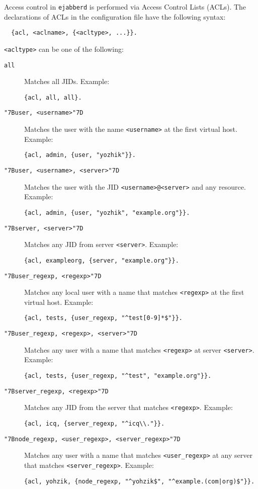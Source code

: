 \documentclass[a4paper,10pt]{article}
\newcommand{\bracehack}{\def\{{\char"7B}\def\}{\char"7D}}
\newcommand{\titem}[1]{\item[\bracehack\texttt{#1}]}
\newcommand{\term}[1]{\texttt{#1}}
\newcommand{\ejabberd}{\texttt{ejabberd}}
\begin{document}
Access control in \ejabberd{} is performed via Access Control Lists (ACLs). The
declarations of ACLs in the configuration file have the following syntax:
\begin{verbatim}
  {acl, <aclname>, {<acltype>, ...}}.
\end{verbatim}
\term{<acltype>} can be one of the following:
\begin{description}
\titem{all} Matches all JIDs. Example:
\begin{verbatim}
{acl, all, all}.
\end{verbatim}
\titem{\{user, <username>\}} Matches the user with the name
  \term{<username>} at the first virtual host. Example:
\begin{verbatim}
{acl, admin, {user, "yozhik"}}.
\end{verbatim}
\titem{\{user, <username>, <server>\}} Matches the user with the JID
  \term{<username>@<server>} and any resource. Example:
\begin{verbatim}
{acl, admin, {user, "yozhik", "example.org"}}.
\end{verbatim}
\titem{\{server, <server>\}} Matches any JID from server
  \term{<server>}. Example:
\begin{verbatim}
{acl, exampleorg, {server, "example.org"}}.
\end{verbatim}
\titem{\{user\_regexp, <regexp>\}} Matches any local user with a name that
  matches \term{<regexp>} at the first virtual host. Example:
\begin{verbatim}
{acl, tests, {user_regexp, "^test[0-9]*$"}}.
\end{verbatim}
\titem{\{user\_regexp, <regexp>, <server>\}} Matches any user with a name
  that matches \term{<regexp>} at server \term{<server>}. Example:
\begin{verbatim}
{acl, tests, {user_regexp, "^test", "example.org"}}.
\end{verbatim}
\titem{\{server\_regexp, <regexp>\}} Matches any JID from the server that
  matches \term{<regexp>}. Example:
\begin{verbatim}
{acl, icq, {server_regexp, "^icq\\."}}.
\end{verbatim}
\titem{\{node\_regexp, <user\_regexp>, <server\_regexp>\}} Matches any user
  with a name that matches \term{<user\_regexp>} at any server that matches
  \term{<server\_regexp>}. Example:
\begin{verbatim}
{acl, yohzik, {node_regexp, "^yohzik$", "^example.(com|org)$"}}.
\end{verbatim}

\end{description}
\end{document}

